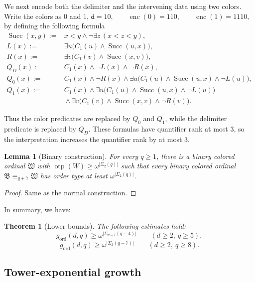 \documentclass{amsart}
\newtheorem{theorem}{Theorem}
\newtheorem{lemma}{Lemma}
\theoremstyle{definition}
\begin{document}
We next encode both the delimiter and the intervening data using two colors. Write the colors as $0$ and $1$,
$\mathtt d=10,\qquad\operatorname{enc}(0)=110,\qquad\operatorname{enc}(1)=1110,$
by defining the following formula
\[\begin{split}
  \operatorname{Succ}(x,y):= {}&x<y\wedge\neg\exists z\,(x<z<y),\\
  L(x):={}&\exists u\bigl(C_1(u)\wedge\operatorname{Succ}(u,x)\bigr),\\  R(x):={}&\exists v\bigl(C_1(v)\wedge\operatorname{Succ}(x,v)\bigr),\\
  Q_D(x):={}&C_1(x)\wedge\neg L(x)\wedge\neg R(x),\\
  Q_0(x):={}&C_1(x)\wedge\neg R(x)\wedge\exists u\bigl(C_1(u)\wedge\operatorname{Succ}(u,x)\wedge\neg L(u)\bigr),\\
  Q_1(x):={}&C_1(x)\wedge\exists u\bigl(C_1(u)\wedge\operatorname{Succ}(u,x)\wedge\neg L(u)\bigr)\\
  &{}\wedge\exists v\bigl(C_1(v)\wedge\operatorname{Succ}(x,v)\wedge\neg R(v)\bigr).
\end{split}\]

Thus the color predicates are replaced by $Q_0$ and $Q_1$, while the delimiter predicate is replaced by $Q_D$. These formulas have quantifier rank at most $3$, so the interpretation increases the quantifier rank by at most $3$.

\begin{lemma}[Binary construction]\label{lem:binary-markers}
    For every $q\geq1$, there is a binary colored ordinal $\mathfrak W$ with $\operatorname{otp}(W)\geqslant \omega^{|\Sigma_2(q)|}$ such that every binary colored ordinal $\mathfrak B\equiv_{q+7}\mathfrak W$ has order type at least $\omega^{|\Sigma_2(q)|}$.
\end{lemma}
\begin{proof}
  Same as the normal construction.
\end{proof}

In summary, we have:

\begin{theorem}[Lower bounds]\label{thm:lower-bounds}
    The following estimates hold:
    $$g_{\mathrm{ord}}(d,q)\geq\omega^{|\Sigma_{d-1} (q-4)|}\qquad(d\geq2,\ q\geq5),$$
    $$g_{\mathrm{ord}}(d,q)\geq\omega^{|\Sigma_2 (q-7)|}\qquad(d\geq2,\ q\geq8).$$
\end{theorem}

\subsection{Tower-exponential growth}
\end{document}
